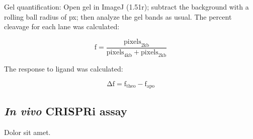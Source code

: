 \documentclass[twocolumn]{article}
\newcommand\px[1]{\unit[#1]{px}}
\newcommand\beginsupplement{%
   \setcounter{table}{0}
   \renewcommand{\thetable}{S\arabic{table}}%
   \setcounter{figure}{0}
   \renewcommand{\thefigure}{S\arabic{figure}}%
}
\begin{document}
Gel quantification: Open gel in ImageJ (1.51r); subtract the background with a 
rolling ball radius of \px{50}; then analyze the gel bands as usual.  The 
percent cleavage for each lane was calculated:

\begin{displaymath}
 \mathrm{f} = \frac{\mathrm{pixels}_\mathrm{2kb}}{\mathrm{pixels}_\mathrm{4kb} 
 + \mathrm{pixels}_\mathrm{2kb}}
\end{displaymath}

The response to ligand was calculated: 

\begin{displaymath}
 \mathrm{Δf} = \mathrm{f}_\mathrm{theo} - \mathrm{f}_\mathrm{apo}
\end{displaymath}

\subsection{\emph{In vivo} CRISPRi assay}

Dolor sit amet.

\printbibliography[title=References]

\beginsupplement

\
\end{document}
